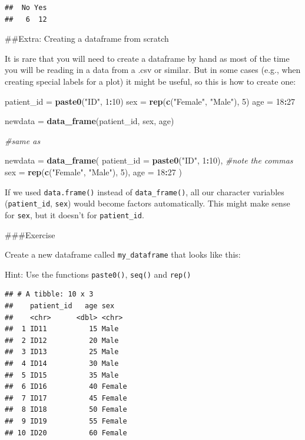 \documentclass[]{book}
\makeatletter
\newenvironment{Shaded}{\begin{snugshade}}{\end{snugshade}}
\newcommand{\CommentTok}[1]{\textcolor[rgb]{0.56,0.35,0.01}{\textit{#1}}}
\newcommand{\DataTypeTok}[1]{\textcolor[rgb]{0.13,0.29,0.53}{#1}}
\newcommand{\DecValTok}[1]{\textcolor[rgb]{0.00,0.00,0.81}{#1}}
\newcommand{\KeywordTok}[1]{\textcolor[rgb]{0.13,0.29,0.53}{\textbf{#1}}}
\newcommand{\NormalTok}[1]{#1}
\newcommand{\OperatorTok}[1]{\textcolor[rgb]{0.81,0.36,0.00}{\textbf{#1}}}
\newcommand{\StringTok}[1]{\textcolor[rgb]{0.31,0.60,0.02}{#1}}
\newenvironment{kframe}{%
\medskip{}
\setlength{\fboxsep}{.8em}
 \def\at@end@of@kframe{}%
 \ifinner\ifhmode%
  \def\at@end@of@kframe{\end{minipage}}%
  \begin{minipage}{\columnwidth}%
 \fi\fi%
 \def\FrameCommand##1{\hskip\@totalleftmargin \hskip-\fboxsep
 \colorbox{shadecolor}{##1}\hskip-\fboxsep
     \hskip-\linewidth \hskip-\@totalleftmargin \hskip\columnwidth}%
 \MakeFramed {\advance\hsize-\width
   \@totalleftmargin\z@ \linewidth\hsize
   \@setminipage}}%
 {\par\unskip\endMakeFramed%
 \at@end@of@kframe}
\renewenvironment{Shaded}{\begin{kframe}}{\end{kframe}}
\theoremstyle{definition}
\theoremstyle{definition}
\theoremstyle{definition}
\theoremstyle{remark}
\makeatother
\begin{document}
\begin{verbatim}
##  No Yes 
##   6  12
\end{verbatim}

\#\#Extra: Creating a dataframe from scratch

It is rare that you will need to create a dataframe by hand as most of
the time you will be reading in a data from a .csv or similar. But in
some cases (e.g., when creating special labels for a plot) it might be
useful, so this is how to create one:

\begin{Shaded}
\begin{Highlighting}[]
\NormalTok{patient_id =}\StringTok{ }\KeywordTok{paste0}\NormalTok{(}\StringTok{"ID"}\NormalTok{, }\DecValTok{1}\OperatorTok{:}\DecValTok{10}\NormalTok{)}
\NormalTok{sex        =}\StringTok{ }\KeywordTok{rep}\NormalTok{(}\KeywordTok{c}\NormalTok{(}\StringTok{"Female"}\NormalTok{, }\StringTok{"Male"}\NormalTok{), }\DecValTok{5}\NormalTok{)}
\NormalTok{age        =}\StringTok{ }\DecValTok{18}\OperatorTok{:}\DecValTok{27}

\NormalTok{newdata =}\StringTok{ }\KeywordTok{data_frame}\NormalTok{(patient_id, sex, age)}

\CommentTok{#same as}

\NormalTok{newdata      =}\StringTok{ }\KeywordTok{data_frame}\NormalTok{(}
  \DataTypeTok{patient_id =} \KeywordTok{paste0}\NormalTok{(}\StringTok{"ID"}\NormalTok{, }\DecValTok{1}\OperatorTok{:}\DecValTok{10}\NormalTok{), }\CommentTok{#note the commas}
  \DataTypeTok{sex        =} \KeywordTok{rep}\NormalTok{(}\KeywordTok{c}\NormalTok{(}\StringTok{"Female"}\NormalTok{, }\StringTok{"Male"}\NormalTok{), }\DecValTok{5}\NormalTok{),}
  \DataTypeTok{age        =} \DecValTok{18}\OperatorTok{:}\DecValTok{27}
\NormalTok{)}
\end{Highlighting}
\end{Shaded}

If we used \texttt{data.frame()} instead of \texttt{data\_frame()}, all
our character variables (\texttt{patient\_id}, \texttt{sex}) would
become factors automatically. This might make sense for \texttt{sex},
but it doesn't for \texttt{patient\_id}.

\#\#\#Exercise

Create a new dataframe called \texttt{my\_dataframe} that looks like
this:

Hint: Use the functions \texttt{paste0()}, \texttt{seq()} and
\texttt{rep()}

\begin{verbatim}
## # A tibble: 10 x 3
##    patient_id   age sex   
##    <chr>      <dbl> <chr> 
##  1 ID11          15 Male  
##  2 ID12          20 Male  
##  3 ID13          25 Male  
##  4 ID14          30 Male  
##  5 ID15          35 Male  
##  6 ID16          40 Female
##  7 ID17          45 Female
##  8 ID18          50 Female
##  9 ID19          55 Female
## 10 ID20          60 Female
\end{verbatim}
\end{document}
